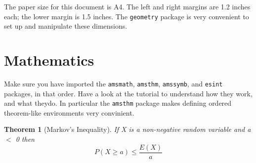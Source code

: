 \documentclass[10pt, Computer Modern]{article}
\newtheorem{theorem}{Theorem}
\begin{document}
The paper size for this document is A4. The left and right margins are 1.2 inches each; the lower margin is 1.5 inches. The \verb!geometry! package is very convenient to set up and manipulate these dimensions.


\clearpage
\section{Mathematics}
\label{maths}

Make sure you have imported the \verb!amsmath!, \verb!amsthm!, \verb!amssymb!, and \verb!esint! packages, in that order. Have a look at the tutorial to understand how they work, and what theydo. In particular the \verb!amsthm! package makes defining ordered theorem-like environments very convinient.

\begin{theorem}[Markov's Inequality]
\label{markov's}
If X is a non-negative random variable and a $ < $ 0 then
\begin{equation*}
P( X \geq a) \leq \frac{E( X )}{a}
\end{equation*}

\end{theorem}
\end{document}
